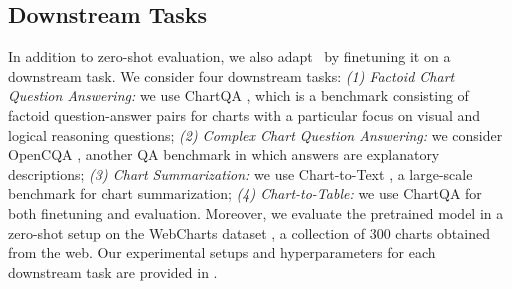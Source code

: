 \subsection{Downstream Tasks}

In addition to zero-shot evaluation, we also adapt \model\ by finetuning it on a downstream task. We consider four downstream tasks: \emph{(1) Factoid Chart Question Answering:} we use ChartQA \cite{masry-etal-2022-chartqa}, which is a benchmark consisting of factoid question-answer pairs for charts with a particular focus on visual and logical reasoning questions; \emph{(2) Complex Chart Question Answering:} we consider OpenCQA \cite{open-CQA}, another QA benchmark in which answers are explanatory descriptions; \emph{(3) Chart Summarization:}  we use Chart-to-Text \cite{chart-to-text-acl}, a large-scale benchmark for chart summarization; \emph{(4) Chart-to-Table:} we use ChartQA for both finetuning and evaluation. Moreover,  we evaluate the pretrained model in a zero-shot setup on the WebCharts dataset \cite{Choi2019VisualizingFT}, a collection of 300 charts obtained from the web. Our experimental setups and hyperparameters for each downstream task are provided in .


